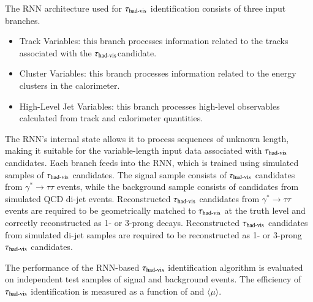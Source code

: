         The RNN architecture used for $\tau_{\text{had-vis}}$ identification consists of three input branches.
        \begin{itemize}
            \item Track Variables: this branch processes information related to the tracks associated with the $\tau_{\text{had-vis}}$candidate.
            \item Cluster Variables: this branch processes information related to the energy clusters in the calorimeter.
            \item High-Level Jet Variables: this branch processes high-level observables calculated from track and calorimeter quantities.
        \end{itemize}
        The RNN's internal state allows it to process sequences of unknown length, making it suitable for the variable-length
        input data associated with $\tau_{\text{had-vis}}$ candidates. 
        Each branch feeds into the RNN, which is trained using simulated samples of $\tau_{\text{had-vis}}$ candidates. 
        The signal sample consists of $\tau_{\text{had-vis}}$ candidates from \(\gamma^* \rightarrow \tau\tau\) events,
        while the background sample consists of candidates from simulated QCD di-jet events.
        Reconstructed $\tau_{\text{had-vis}}$ candidates from \(\gamma^* \rightarrow \tau\tau\) events are required to 
        be geometrically matched to $\tau_{\text{had-vis}}$ at the truth level and correctly reconstructed as 1- or 3-prong decays. 
        Reconstructed $\tau_{\text{had-vis}}$ candidates from simulated di-jet samples are required to be reconstructed as 1- or 
        3-prong $\tau_{\text{had-vis}}$ candidates.

        The performance of the RNN-based $\tau_{\text{had-vis}}$ identification algorithm is evaluated on independent 
        test samples of signal and background events. The efficiency of $\tau_{\text{had-vis}}$ identification is 
        measured as a function of \tauhadvis \pT and $\langle \mu \rangle$.

